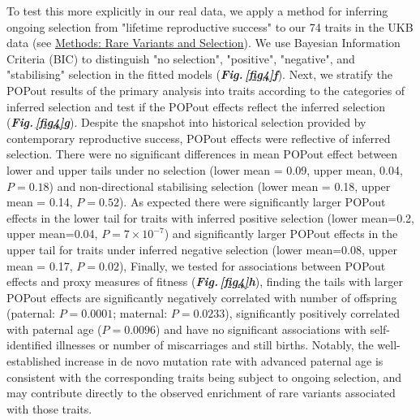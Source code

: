\documentclass[12pt]{zHenriquesLab-StyleBioRxiv}
\newcommand\dref[2]{\normalsize{\textbf{\textit{Fig.\,\ref{#1}#2}}}\normalsize{}}
\begin{document}
\FloatBarrier
To test this more explicitly in our real data, we apply a 
method \cite{Sanjak2018} for inferring ongoing selection from 
"lifetime reproductive success" to our 74 traits in the UKB 
data (see \hyperref[sec:methods:rvs]{Methods: Rare Variants and Selection}). 
We use Bayesian Information Criteria (BIC) 
to distinguish "no selection", "positive", "negative", and 
"stabilising" selection in the fitted models (\dref{fig4}{f}). 
Next, we stratify the POPout results of the primary analysis into 
traits according to the categories of inferred selection and test if 
the POPout effects reflect the inferred selection (\dref{fig4}{g}). 
Despite the snapshot into historical selection provided by 
contemporary reproductive success, POPout effects were reflective 
of inferred selection. There were no significant differences in 
mean POPout effect between lower and upper tails under no selection 
(lower mean = 0.09, upper mean, 0.04, $P=0.18$) 
and non-directional stabilising selection (lower mean = 0.18, upper mean = 0.14, $P=0.52$). 
As expected there were significantly larger POPout effects in the lower tail 
for traits with inferred positive selection (lower mean=0.2, upper mean=0.04, $P=7 \times 10^{-7}$) 
and significantly larger POPout effects in the upper 
tail for traits under inferred negative selection (lower mean=0.08, upper mean = 0.17, $P=0.02$), 
Finally, we tested for associations between POPout effects and proxy measures of fitness (\dref{fig4}{h}), 
finding the tails with larger POPout effects are significantly negatively correlated with number of offspring 
(paternal: $P=0.0001$; maternal: $P=0.0233$), 
significantly positively correlated with paternal age ($P=0.0096$) and have no significant associations with 
self-identified illnesses or number of miscarriages and still births. Notably, the well-established 
increase in de novo mutation rate with advanced paternal age\cite{Kong2012} is consistent with the corresponding 
traits being subject to ongoing selection, and may contribute directly to the observed enrichment of rare 
variants associated with those traits.
% 
% 
% 
% 
% 
% 
% 
% 
% 
% 
% 
% 
% 
% 
% 
% 
% 
% 
% 
% 
% 
% 
% 
% 
% 
% 
% 
% 
% 
% 
% 
% 
% 
% 
% 
% 
% 
% 
% 
% 
% 
% 
% 
% 
% 
% 
% 
% 
% 
% 
\FloatBarrier
\end{document}
